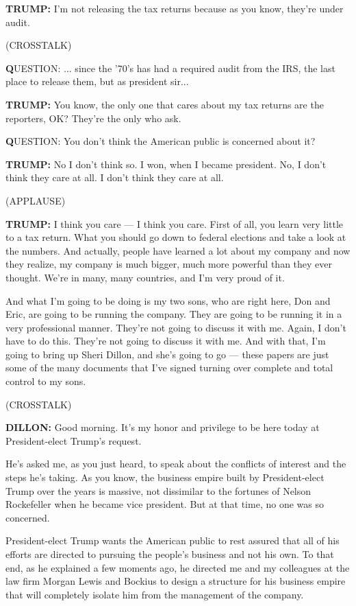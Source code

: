 \textbf{TRUMP:} I'm not releasing the tax returns because as you know,
they're under audit.

(CROSSTALK)

\textbf{Q}UESTION: ... since the '70's has had a required audit from the
IRS, the last place to release them, but as president sir...

\textbf{TRUMP:} You know, the only one that cares about my tax returns
are the reporters, OK? They're the only who ask.

\textbf{Q}UESTION: You don't think the American public is concerned
about it?

\textbf{TRUMP:} No I don't think so. I won, when I became president. No,
I don't think they care at all. I don't think they care at all.

(APPLAUSE)

\textbf{TRUMP:} I think you care --- I think you care. First of all, you
learn very little to a tax return. What you should go down to federal
elections and take a look at the numbers. And actually, people have
learned a lot about my company and now they realize, my company is much
bigger, much more powerful than they ever thought. We're in many, many
countries, and I'm very proud of it.

And what I'm going to be doing is my two sons, who are right here, Don
and Eric, are going to be running the company. They are going to be
running it in a very professional manner. They're not going to discuss
it with me. Again, I don't have to do this. They're not going to discuss
it with me. And with that, I'm going to bring up Sheri Dillon, and she's
going to go --- these papers are just some of the many documents that
I've signed turning over complete and total control to my sons.

(CROSSTALK)

\textbf{DILLON:} Good morning. It's my honor and privilege to be here
today at President-elect Trump's request.

He's asked me, as you just heard, to speak about the conflicts of
interest and the steps he's taking. As you know, the business empire
built by President-elect Trump over the years is massive, not dissimilar
to the fortunes of Nelson Rockefeller when he became vice president. But
at that time, no one was so concerned.

President-elect Trump wants the American public to rest assured that all
of his efforts are directed to pursuing the people's business and not
his own. To that end, as he explained a few moments ago, he directed me
and my colleagues at the law firm Morgan Lewis and Bockius to design a
structure for his business empire that will completely isolate him from
the management of the company.

